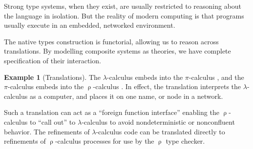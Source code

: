 \documentclass[12pt]{article}
\theoremstyle{definition}
\newtheorem{example}[theorem]{Example}
\begin{document}
Strong type systems, when they exist, are usually restricted to reasoning about the language in isolation. But the reality of modern computing is that programs usually execute in an embedded, networked environment.

The native types construction is functorial, allowing us to reason across translations. By modelling composite systems as theories, we have complete specification of their interaction.

\begin{example}[Translations]
The $\lambda$-calculus embeds into the $\pi$-calculus \cite{pical}, and the $\pi$-calculus embeds into the $\uprho$-calculus \cite{rhocal}. In effect, the translation interprets the $\lambda$-calculus as a computer, and places it on one name, or node in a network.

Such a translation can act as a ``foreign function interface'' enabling the $\uprho$-calculus to ``call out'' to $\lambda$-calculus to avoid nondeterministic or nonconfluent behavior.  The refinements of $\lambda$-calculus code can be translated directly to refinements of $\uprho$-calculus processes for use by the $\uprho$ type checker.
\end{example}
\end{document}
